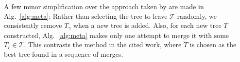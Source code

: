 A few minor simplification over the approach taken by \citet{pajor18} are made in Alg.\ \ref{alg:meta}:
Rather than selecting the tree to leave $\mathcal{T}$ randomly, we consistently remove $T_{\gamma}$ when a new tree is added.
Also, for each new tree $T$ constructed, Alg.\ \ref{alg:meta} makes only one attempt to merge it with some $T_r\in\mathcal{T}$.
This contrasts the method in the cited work, where $\tilde{T}$ is chosen as the best tree found in a sequence of merges.

